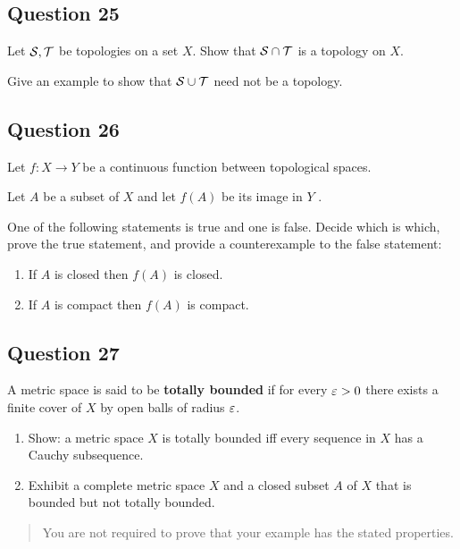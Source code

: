 \documentclass[12pt]{article}
\begin{document}
\hypertarget{question-25-3}{%
\subsection{Question 25}\label{question-25-3}}

Let \({\mathcal{S}}, {\mathcal{T}}\) be topologies on a set \(X\). Show that
\({\mathcal{S}} \cap {\mathcal{T}}\) is a topology on \(X\).

Give an example to show that \({\mathcal{S}} \cup {\mathcal{T}}\) need not be a topology.

\hypertarget{question-26-3}{%
\subsection{Question 26}\label{question-26-3}}

Let \(f : X \to Y\) be a continuous function between topological spaces.

Let \(A\) be a subset of \(X\) and let \(f (A)\) be its image in \(Y\) .

One of the following statements is true and one is false. Decide which
is which, prove the true statement, and provide a counterexample to the
false statement:

\begin{enumerate}
\def\labelenumi{\arabic{enumi}.}
\item
  If \(A\) is closed then \(f (A)\) is closed.
\item
  If \(A\) is compact then \(f (A)\) is compact.
\end{enumerate}

\hypertarget{question-27-3}{%
\subsection{Question 27}\label{question-27-3}}

A metric space is said to be \textbf{totally bounded} if for every
\(\varepsilon > 0\) there exists a finite cover of \(X\) by open balls of
radius \(\varepsilon\).

\begin{enumerate}
\def\labelenumi{\alph{enumi}.}
\item
  Show: a metric space \(X\) is totally bounded iff every sequence in
  \(X\) has a Cauchy subsequence.
\item
  Exhibit a complete metric space \(X\) and a closed subset \(A\) of
  \(X\) that is bounded but not totally bounded.
\end{enumerate}

\begin{quote}
You are not required to prove that your example has the stated
properties.
\end{quote}
\end{document}
